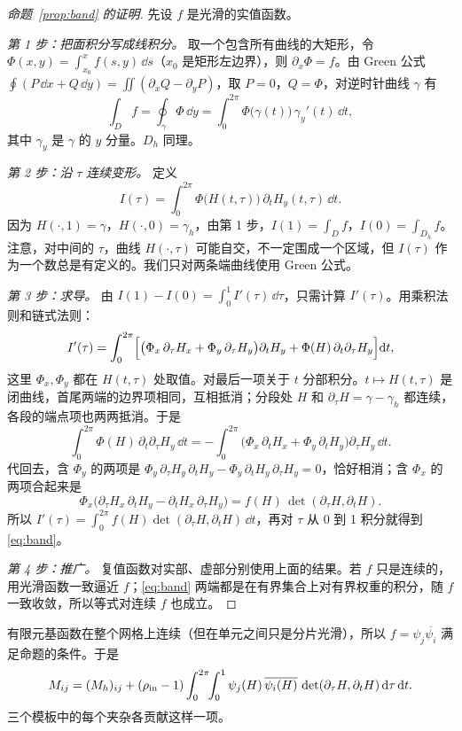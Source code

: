 \documentclass[11pt,a4paper,fontset=fandol]{ctexart}
\begin{document}
\begin{proof}[命题~\ref{prop:band} 的证明]
先设 $f$ 是光滑的实值函数。

\emph{第 1 步：把面积分写成线积分。} 取一个包含所有曲线的大矩形，令 $\Phi(x,y)=\int_{x_0}^xf(s,y)\,\dd s$（$x_0$ 是矩形左边界），则 $\partial_x\Phi=f$。由 Green 公式 $\oint(P\,\dd x+Q\,\dd y)=\iint(\partial_xQ-\partial_yP)$，取 $P=0$，$Q=\Phi$，对逆时针曲线 $\gamma$ 有
\[
\int_Df=\oint_\gamma\Phi\,\dd y=\int_0^{2\pi}\Phi\bigl(\gamma(t)\bigr)\,\gamma_y'(t)\,\dd t ,
\]
其中 $\gamma_y$ 是 $\gamma$ 的 $y$ 分量。$D_h$ 同理。

\emph{第 2 步：沿 $\tau$ 连续变形。} 定义
\[
I(\tau)=\int_0^{2\pi}\Phi\bigl(H(t,\tau)\bigr)\,\partial_tH_y(t,\tau)\,\dd t .
\]
因为 $H(\cdot,1)=\gamma$，$H(\cdot,0)=\gamma_h$，由第 1 步，$I(1)=\int_Df$，$I(0)=\int_{D_h}f$。注意，对中间的 $\tau$，曲线 $H(\cdot,\tau)$ 可能自交，不一定围成一个区域，但 $I(\tau)$ 作为一个数总是有定义的。我们只对两条端曲线使用 Green 公式。

\emph{第 3 步：求导。} 由 $I(1)-I(0)=\int_0^1I'(\tau)\,\dd\tau$，只需计算 $I'(\tau)$。用乘积法则和链式法则：
\[
I'(\tau)=\int_0^{2\pi}\Bigl[\bigl(\Phi_x\,\partial_\tau H_x+\Phi_y\,\partial_\tau H_y\bigr)\partial_tH_y+\Phi(H)\,\partial_t\partial_\tau H_y\Bigr]\mathrm{d} t ,
\]
这里 $\Phi_x,\Phi_y$ 都在 $H(t,\tau)$ 处取值。对最后一项关于 $t$ 分部积分。$t\mapsto H(t,\tau)$ 是闭曲线，首尾两端的边界项相同，互相抵消；分段处 $H$ 和 $\partial_\tau H=\gamma-\gamma_h$ 都连续，各段的端点项也两两抵消。于是
\[
\int_0^{2\pi}\Phi(H)\,\partial_t\partial_\tau H_y\,\dd t=-\int_0^{2\pi}\bigl(\Phi_x\,\partial_tH_x+\Phi_y\,\partial_tH_y\bigr)\partial_\tau H_y\,\dd t .
\]
代回去，含 $\Phi_y$ 的两项是 $\Phi_y\,\partial_\tau H_y\,\partial_tH_y-\Phi_y\,\partial_tH_y\,\partial_\tau H_y=0$，恰好相消；含 $\Phi_x$ 的两项合起来是
\[
\Phi_x\bigl(\partial_\tau H_x\,\partial_tH_y-\partial_tH_x\,\partial_\tau H_y\bigr)=f(H)\,\det(\partial_\tau H,\partial_tH).
\]
所以 $I'(\tau)=\int_0^{2\pi}f(H)\det(\partial_\tau H,\partial_tH)\,\dd t$，再对 $\tau$ 从 0 到 1 积分就得到 \eqref{eq:band}。

\emph{第 4 步：推广。} 复值函数对实部、虚部分别使用上面的结果。若 $f$ 只是连续的，用光滑函数一致逼近 $f$；\eqref{eq:band} 两端都是在有界集合上对有界权重的积分，随 $f$ 一致收敛，所以等式对连续 $f$ 也成立。
\end{proof}

有限元基函数在整个网格上连续（但在单元之间只是分片光滑），所以 $f=\psi_j\overline{\psi_i}$ 满足命题的条件。于是
\begin{equation}
\label{eq:true-mass}
M_{ij}=(M_h)_{ij}+(\rho_{\rm in}-1)\int_0^{2\pi}\!\!\int_0^1\psi_j(H)\,\overline{\psi_i(H)}\,\det(\partial_\tau H,\partial_tH)\,\mathrm{d}\tau\,\mathrm{d} t .
\end{equation}
三个模板中的每个夹杂各贡献这样一项。
\end{document}
